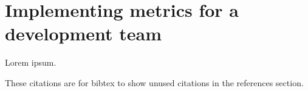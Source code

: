 \chapter{Implementing metrics for a development team}

Lorem ipsum.

These citations are for bibtex to show unused citations in the references section.

\cite{tikka2014}

\cite{coleman1994using}

\cite{viljanen2015measuring}

\cite{zhuo1993constructing}

\cite{al2005analysis}

\cite{jamali2006object}

\cite{sarker2005overview}






